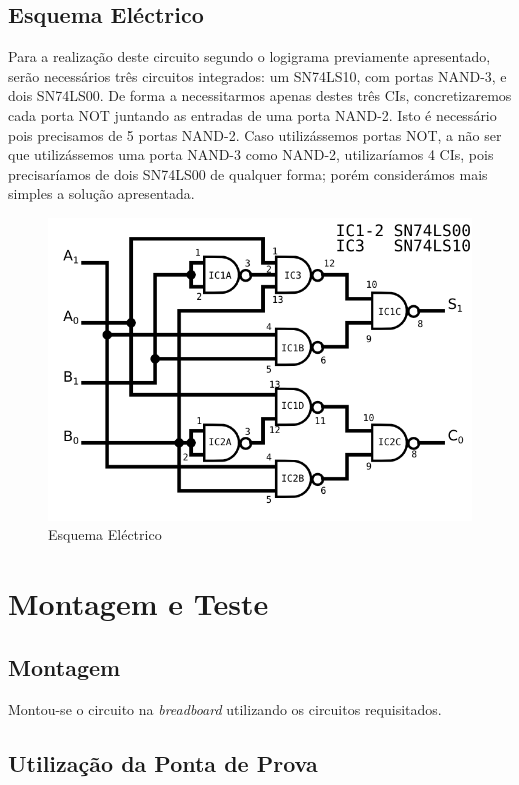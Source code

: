 \documentclass[a4paper,12pt]{article}
\begin{document}
\subsection{Esquema Eléctrico}
Para a realização deste circuito segundo o logigrama previamente apresentado, 
serão necessários três circuitos integrados: um SN74LS10, com portas NAND-3,
e dois SN74LS00. De forma a necessitarmos apenas destes três CIs,
concretizaremos cada porta NOT juntando as entradas de uma porta NAND-2.
Isto é necessário pois precisamos de 5 portas NAND-2. Caso utilizássemos portas
NOT, a não ser que utilizássemos uma porta NAND-3 como NAND-2, utilizaríamos 
4 CIs, pois precisaríamos de dois SN74LS00 de qualquer forma;
porém considerámos mais simples a solução apresentada.

\begin{figure}[h]
\caption{Esquema Eléctrico}
\begin{center}
\includegraphics[scale=0.65]{SD_elect.png}
\end{center}
\end{figure}

\section{Montagem e Teste}
\subsection{Montagem}
Montou-se o circuito na {\it breadboard} utilizando os circuitos requisitados.
\subsection{Utilização da Ponta de Prova}
\pagebreak
\end{document}
